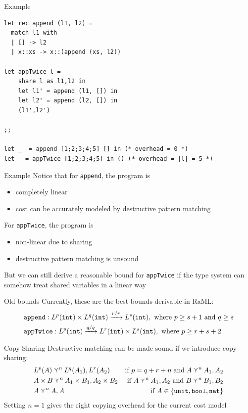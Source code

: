\documentclass{beamer}
\newcommand{\irl}[1]{\mathtt{#1}}
\theoremstyle{definition}
\begin{document}
\begin{frame}[fragile]{Example}
  \begin{verbatim}
let rec append (l1, l2) =
  match l1 with
  | [] -> l2
  | x::xs -> x::(append (xs, l2))

let appTwice l = 
    share l as l1,l2 in
    let l1' = append (l1, []) in 
    let l2' = append (l2, []) in 
    (l1',l2')

;;

let _  = append [1;2;3;4;5] [] in (* overhead = 0 *)
let _ = appTwice [1;2;3;4;5] in () (* overhead = |l| = 5 *)
  \end{verbatim}
\end{frame}


\begin{frame}{Example}
  Notice that for \texttt{append}, the program is 
  \begin{itemize}
  \item completely linear
  \item cost can be accurately modeled by destructive pattern matching
  \end{itemize}
  For \texttt{appTwice}, the program is
  \begin{itemize}
  \item non-linear due to sharing
  \item destructive pattern matching is unsound
  \end{itemize}
  But we can still derive a reasonable bound for \texttt{appTwice} if the type system can 
  somehow treat shared variables in a linear way
\end{frame}

\begin{frame}{Old bounds}
  Currently, these are the best bounds derivable in RaML:
  \begin{align*}
	&\texttt{append} : \prodtycst{L^p(\irl{int})}{L^q(\irl{int})} \xrightarrow{r/r} L^s(\irl{int}), \text{ 
	where } p \ge s + 1 \text{ and } q \ge s\\
	&\texttt{appTwice} : L^p(\irl{int}) \xrightarrow{q/q} \prodtycst{L^r(\irl{int})}{L^s(\irl{int})},
	\text{ where } p \ge r + s + 2
\end{align*}

\end{frame}

\begin{frame}{Copy Sharing}
Destructive matching can be made sound if we introduce copy sharing:
\begin{align*}
	&L^p(A) \curlyvee^n L^q(A_1),L^r(A_2) & \text{if } p = q + r + n \;\text{and}\; 
			A \curlyvee^n A_1,A_2\\
	&\prodtycst{A}{B} \curlyvee^n \prodtycst{A_1}{B_1}, \prodtycst{A_2}{B_2}
		&\text{ if } A \curlyvee^n A_1,A_2 \text{ and } B \curlyvee^n B_1,B_2\\
	&A \curlyvee^n  A,A& \text{ if } A \in \{\unittycst, \booltycst, \irl{nat}\}
\end{align*}
Setting $n = 1$ gives the right copying overhead for the current cost model
\end{frame}
\end{document}

